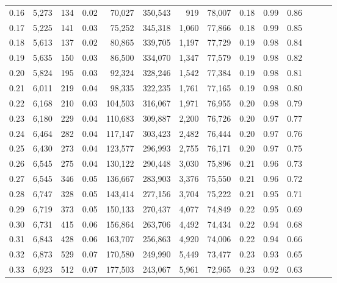\begin{tabular}{rrrrrrrrrrrrrr}
0.16 &   5,273 &    134 &  0.02 &   70,027 &  350,543 &     919 &  78,007 &  0.18 &  0.99 &      0.86 \\
0.17 &   5,225 &    141 &  0.03 &   75,252 &  345,318 &   1,060 &  77,866 &  0.18 &  0.99 &      0.85 \\
0.18 &   5,613 &    137 &  0.02 &   80,865 &  339,705 &   1,197 &  77,729 &  0.19 &  0.98 &      0.84 \\
0.19 &   5,635 &    150 &  0.03 &   86,500 &  334,070 &   1,347 &  77,579 &  0.19 &  0.98 &      0.82 \\
0.20 &   5,824 &    195 &  0.03 &   92,324 &  328,246 &   1,542 &  77,384 &  0.19 &  0.98 &      0.81 \\
0.21 &   6,011 &    219 &  0.04 &   98,335 &  322,235 &   1,761 &  77,165 &  0.19 &  0.98 &      0.80 \\
0.22 &   6,168 &    210 &  0.03 &  104,503 &  316,067 &   1,971 &  76,955 &  0.20 &  0.98 &      0.79 \\
0.23 &   6,180 &    229 &  0.04 &  110,683 &  309,887 &   2,200 &  76,726 &  0.20 &  0.97 &      0.77 \\
0.24 &   6,464 &    282 &  0.04 &  117,147 &  303,423 &   2,482 &  76,444 &  0.20 &  0.97 &      0.76 \\
0.25 &   6,430 &    273 &  0.04 &  123,577 &  296,993 &   2,755 &  76,171 &  0.20 &  0.97 &      0.75 \\
0.26 &   6,545 &    275 &  0.04 &  130,122 &  290,448 &   3,030 &  75,896 &  0.21 &  0.96 &      0.73 \\
0.27 &   6,545 &    346 &  0.05 &  136,667 &  283,903 &   3,376 &  75,550 &  0.21 &  0.96 &      0.72 \\
0.28 &   6,747 &    328 &  0.05 &  143,414 &  277,156 &   3,704 &  75,222 &  0.21 &  0.95 &      0.71 \\
0.29 &   6,719 &    373 &  0.05 &  150,133 &  270,437 &   4,077 &  74,849 &  0.22 &  0.95 &      0.69 \\
0.30 &   6,731 &    415 &  0.06 &  156,864 &  263,706 &   4,492 &  74,434 &  0.22 &  0.94 &      0.68 \\
0.31 &   6,843 &    428 &  0.06 &  163,707 &  256,863 &   4,920 &  74,006 &  0.22 &  0.94 &      0.66 \\
0.32 &   6,873 &    529 &  0.07 &  170,580 &  249,990 &   5,449 &  73,477 &  0.23 &  0.93 &      0.65 \\
0.33 &   6,923 &    512 &  0.07 &  177,503 &  243,067 &   5,961 &  72,965 &  0.23 &  0.92 &      0.63 \\

\end{tabular}
